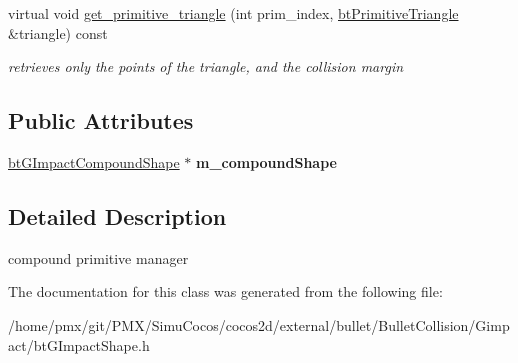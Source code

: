 \begin{DoxyCompactItemize}
\item 
\mbox{\label{classbtGImpactCompoundShape_1_1CompoundPrimitiveManager_ae6937811f4217de508b7fa9304212a3d}} 
virtual void \hyperlink{classbtGImpactCompoundShape_1_1CompoundPrimitiveManager_ae6937811f4217de508b7fa9304212a3d}{get\+\_\+primitive\+\_\+triangle} (int prim\+\_\+index, \hyperlink{classbtPrimitiveTriangle}{bt\+Primitive\+Triangle} \&triangle) const
\begin{DoxyCompactList}\small\item\em retrieves only the points of the triangle, and the collision margin \end{DoxyCompactList}\end{DoxyCompactItemize}
\subsection*{Public Attributes}
\begin{DoxyCompactItemize}
\item 
\mbox{\label{classbtGImpactCompoundShape_1_1CompoundPrimitiveManager_a09d5043ad30afc67e00e038b03a48980}} 
\hyperlink{classbtGImpactCompoundShape}{bt\+G\+Impact\+Compound\+Shape} $\ast$ {\bfseries m\+\_\+compound\+Shape}
\end{DoxyCompactItemize}


\subsection{Detailed Description}
compound primitive manager 

The documentation for this class was generated from the following file\+:\begin{DoxyCompactItemize}
\item 
/home/pmx/git/\+P\+M\+X/\+Simu\+Cocos/cocos2d/external/bullet/\+Bullet\+Collision/\+Gimpact/bt\+G\+Impact\+Shape.\+h\end{DoxyCompactItemize}
